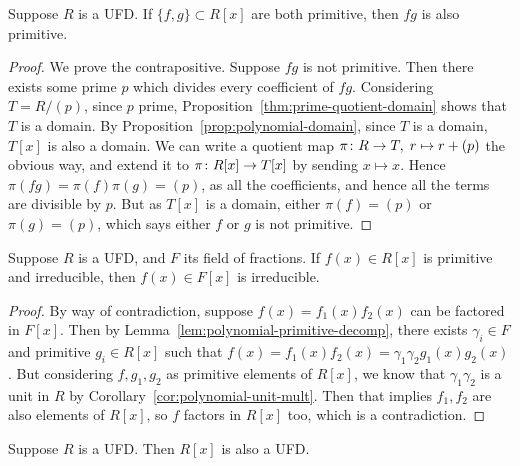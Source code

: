 \begin{lemma}\label{lem:gauss-primitive}
    Suppose \(R\) is a UFD.\@
    If \(\{f,g\} \subset R[x]\) are both primitive,
    then \(fg\) is also primitive.
\end{lemma}
\begin{proof}
    We prove the contrapositive.
    Suppose \(fg\) is not primitive.
    Then there exists some prime \(p\) which divides every coefficient of \(fg\).
    Considering \(T = R/(p)\), since \(p\) prime,
    Proposition~\ref{thm:prime-quotient-domain} shows that \(T\) is a domain.
    By Proposition~\ref{prop:polynomial-domain},
    since \(T\) is a domain, \(T[x]\) is also a domain.
    We can write a quotient map \(\pi\colon R\to T,\;r\mapsto r+(p)\) the obvious way,
    and extend it to \(\pi\colon R[x]\to T[x]\) by sending \(x \mapsto x\).
    Hence \(\pi(fg) = \pi(f)\pi(g) = (p)\),
    as all the coefficients, and hence all the terms are divisible by \(p\).
    But as \(T[x]\) is a domain, either \(\pi(f) = (p)\) or \(\pi(g) = (p)\),
    which says either \(f\) or \(g\) is not primitive.
\end{proof}
\begin{lemma}\label{lem:gauss-irreducible}
    Suppose \(R\) is a UFD, and \(F\) its field of fractions.
    If \(f(x) \in R[x]\) is primitive and irreducible,
    then \(f(x) \in F[x]\) is irreducible.
\end{lemma}
\begin{proof}
    By way of contradiction, suppose \(f(x) = f_1(x)f_2(x)\)
    can be factored in \(F[x]\).
    Then by Lemma~\ref{lem:polynomial-primitive-decomp},
    there exists \(\gamma_i \in F\) and primitive \(g_i \in R[x]\)
    such that \(f(x) = f_1(x)f_2(x) = \gamma_1\gamma_2 g_1(x)g_2(x)\).
    But considering \(f,g_1,g_2\) as primitive elements of \(R[x]\),
    we know that \(\gamma_1\gamma_2\) is a unit in \(R\)
    by Corollary~\ref{cor:polynomial-unit-mult}.
    Then that implies \(f_1,f_2\) are also elements of \(R[x]\),
    so \(f\) factors in \(R[x]\) too,
    which is a contradiction.
\end{proof}
\begin{theorem}\label{thm:polynomial-ring-ufd}
    Suppose \(R\) is a UFD.\@
    Then \(R[x]\) is also a UFD.\@
\end{theorem}
